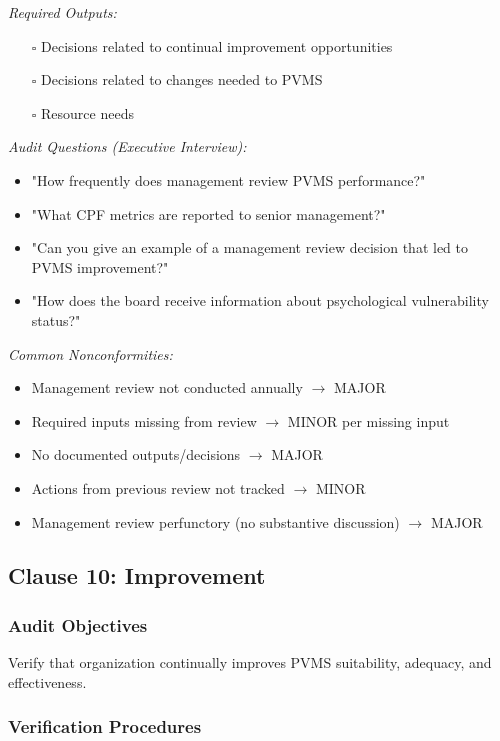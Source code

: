 \documentclass[11pt,a4paper]{article}
\begin{document}
\textit{Required Outputs:}

\begin{itemize}
\item[$\square$] Decisions related to continual improvement opportunities
\item[$\square$] Decisions related to changes needed to PVMS
\item[$\square$] Resource needs
\end{itemize}

\textit{Audit Questions (Executive Interview):}
\begin{itemize}
\item "How frequently does management review PVMS performance?"
\item "What CPF metrics are reported to senior management?"
\item "Can you give an example of a management review decision that led to PVMS improvement?"
\item "How does the board receive information about psychological vulnerability status?"
\end{itemize}

\textit{Common Nonconformities:}
\begin{itemize}
\item Management review not conducted annually $\rightarrow$ MAJOR
\item Required inputs missing from review $\rightarrow$ MINOR per missing input
\item No documented outputs/decisions $\rightarrow$ MAJOR
\item Actions from previous review not tracked $\rightarrow$ MINOR
\item Management review perfunctory (no substantive discussion) $\rightarrow$ MAJOR
\end{itemize}

\subsection{Clause 10: Improvement}

\subsubsection{Audit Objectives}

Verify that organization continually improves PVMS suitability, adequacy, and effectiveness.

\subsubsection{Verification Procedures}
\end{document}
